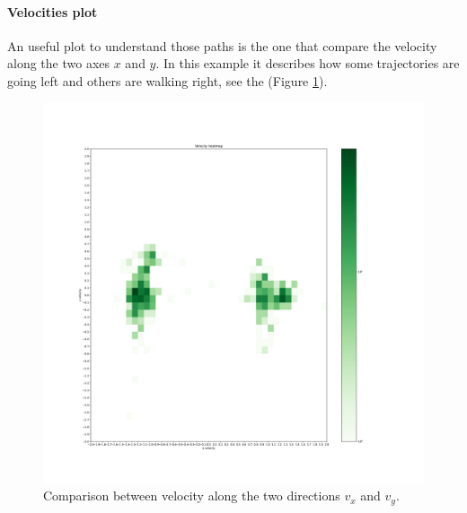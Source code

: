\documentclass[class=article, crop=false]{standalone}
\begin{document}
\paragraph{Velocities plot}
An useful plot to understand those paths is the one that compare the velocity along the two axes $x$ and $y$.
In this example it describes how some trajectories are going left and others are walking right, see the (Figure \ref{fig:5pids_velhist}).
\begin{figure}[h]
\centering
\includegraphics[scale=0.1]{fig/5pids/figure_trainf10_few_trajectories_Dx200_Dy100_VELHIST}
\captionsetup{width=.5\linewidth}
\caption{Comparison between velocity along the two directions $v_x$ and $v_y$.}
\label{fig:5pids_velhist}
\end{figure}
\end{document}
